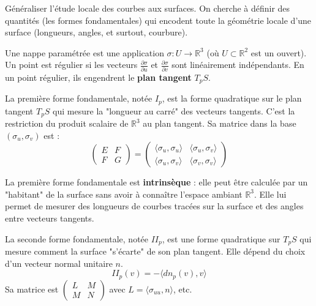 \begin{objectif}
    Généraliser l'étude locale des courbes aux surfaces. On cherche à définir des quantités (les formes fondamentales) qui encodent toute la géométrie locale d'une surface (longueurs, angles, et surtout, courbure).
\end{objectif}

\begin{definition}
    Une nappe paramétrée est une application $\sigma: U \to \mathbb{R}^3$ (où $U \subset \mathbb{R}^2$ est un ouvert). Un point est régulier si les vecteurs $\frac{\partial\sigma}{\partial u}$ et $\frac{\partial\sigma}{\partial v}$ sont linéairement indépendants. En un point régulier, ils engendrent le \textbf{plan tangent} $T_p S$.
\end{definition}

\begin{definition}
    La première forme fondamentale, notée $I_p$, est la forme quadratique sur le plan tangent $T_p S$ qui mesure la "longueur au carré" des vecteurs tangents. C'est la restriction du produit scalaire de $\mathbb{R}^3$ au plan tangent. Sa matrice dans la base $(\sigma_u, \sigma_v)$ est :
    $$ \begin{pmatrix} E & F \\ F & G \end{pmatrix} = \begin{pmatrix} \langle \sigma_u, \sigma_u \rangle & \langle \sigma_u, \sigma_v \rangle \\ \langle \sigma_u, \sigma_v \rangle & \langle \sigma_v, \sigma_v \rangle \end{pmatrix} $$
\end{definition}
\begin{remark}
    La première forme fondamentale est \textbf{intrinsèque} : elle peut être calculée par un "habitant" de la surface sans avoir à connaître l'espace ambiant $\mathbb{R}^3$. Elle lui permet de mesurer des longueurs de courbes tracées sur la surface et des angles entre vecteurs tangents.
\end{remark}

\begin{definition}
    La seconde forme fondamentale, notée $II_p$, est une forme quadratique sur $T_p S$ qui mesure comment la surface "s'écarte" de son plan tangent. Elle dépend du choix d'un vecteur normal unitaire $n$.
    $$ II_p(v) = - \langle dn_p(v), v \rangle $$
    Sa matrice est $\begin{pmatrix} L & M \\ M & N \end{pmatrix}$ avec $L=\langle \sigma_{uu}, n \rangle$, etc.
\end{definition}


